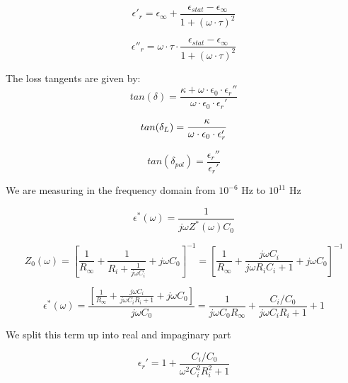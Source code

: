\begin{equation}
\epsilon'_r = \epsilon_{\infty} + \frac{\epsilon_{stat}-\epsilon_{\infty}}{1+(\omega \cdot \tau )^2}
\end{equation}

\begin{equation}
\epsilon''_r = \omega \cdot \tau \cdot \frac{\epsilon_{stat}-\epsilon_{\infty}}{1+(\omega \cdot \tau )^2}
\end{equation}

The loss tangents are given by:
\begin{equation}
tan (\delta) = \frac{\kappa + \omega \cdot \epsilon_0 \cdot \epsilon _r ''}{\omega \cdot \epsilon_0 \cdot \epsilon _r '}
\end{equation}

\begin{equation}
tan (\delta_{L}) = \frac{\kappa}{\omega \cdot \epsilon_0 \cdot \epsilon_r'} \newline
\end{equation}

\begin{equation}
tan (\delta_{pol}) = \frac {\epsilon_r'' } {\epsilon_r'}
\end{equation}


We are measuring in the frequency domain from $10^{-6}$ Hz to $10^{11}$ Hz 

\begin{equation}
\epsilon^*(\omega) = \frac{1}{j \omega  Z^*(\omega) C_0}
\end{equation}

\begin{equation}
Z_0(\omega)=[\frac{1}{R_\infty}+\frac{1}{R_i+\frac{1}{j \omega C_i}}+j \omega C_0]^{-1} = [\frac{1}{R_\infty}+\frac{j \omega C_i}{j\omega R_i  C_i+1}+j \omega C_0]^{-1}
\end{equation}

\begin{equation}
\epsilon^*(\omega)= \frac{[\frac{1}{R_\infty}+\frac{j \omega C_i}{j\omega C_i R_i  +1}+j \omega C_0]}{j \omega C_0} = \frac{1}{j \omega C_0 R_\infty}+ \frac{C_i/C_0}{j\omega C_i R_i  +1}+1
\end{equation}

We split this term up into real and impaginary part 

\begin{equation}
\epsilon_r' = 1+ \frac{C_i/C_0}{\omega^2 C_i^2 R_i^2 +1}
\end{equation}

